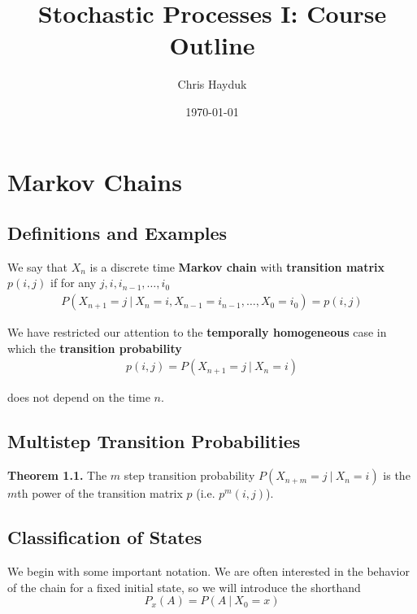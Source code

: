 \documentclass[12pt]{article}
\begin{document}
\title{Stochastic Processes I: Course Outline}

\author{Chris Hayduk}
\date{\today}

\maketitle

\section{Markov Chains}

\subsection{Definitions and Examples}

We say that $X_n$ is a discrete time \textbf{Markov chain} with \textbf{transition matrix} $p(i, j)$ if for any $j, i, i_{n-1}, \ldots, i_0$
\begin{align*}
P(X_{n+1} = j \ | \ X_n = i, X_{n-1} = i_{n-1}, \ldots, X_0 = i_0) = p(i, j)
\end{align*}

We have restricted our attention to the \textbf{temporally homogeneous} case in which the \textbf{transition probability}
\begin{align*}
p(i, j) = P(X_{n+1} = j \ | \ X_n = i)
\end{align*}

does not depend on the time $n$.


\subsection{Multistep Transition Probabilities}

\textbf{Theorem 1.1.} The $m$ step transition probability $P(X_{n+m} = j \ | \ X_n = i)$ is the $m$th power of the transition matrix $p$ (i.e. $p^m(i, j)$).


\subsection{Classification of States}

We begin with some important notation. We are often interested in the behavior of the chain for a fixed initial state, so we will introduce the shorthand $$P_x(A) = P(A \ | \ X_0 = x)$$
\end{document}
